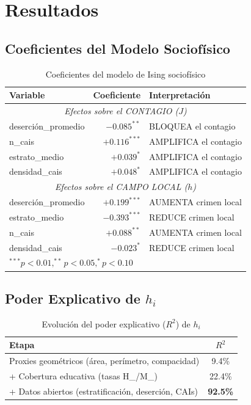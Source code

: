 \documentclass[12pt,a4paper]{article}
\begin{document}
\section{Resultados}

\subsection{Coeficientes del Modelo Sociofísico}

\begin{table}[H]
\centering
\caption{Coeficientes del modelo de Ising sociofísico}
\label{tab:coeficientes}
\begin{tabular}{@{}lrl@{}}
\toprule
\textbf{Variable} & \textbf{Coeficiente} & \textbf{Interpretación} \\
\midrule
\multicolumn{3}{c}{\textit{Efectos sobre el CONTAGIO ($J$)}} \\
\midrule
deserción\_promedio & $-0.085^{**}$ & BLOQUEA el contagio \\
n\_cais & $+0.116^{***}$ & AMPLIFICA el contagio \\
estrato\_medio & $+0.039^{*}$ & AMPLIFICA el contagio \\
densidad\_cais & $+0.048^{*}$ & AMPLIFICA el contagio \\
\midrule
\multicolumn{3}{c}{\textit{Efectos sobre el CAMPO LOCAL ($h$)}} \\
\midrule
deserción\_promedio & $+0.199^{***}$ & AUMENTA crimen local \\
estrato\_medio & $-0.393^{***}$ & REDUCE crimen local \\
n\_cais & $+0.088^{**}$ & AUMENTA crimen local \\
densidad\_cais & $-0.023^{*}$ & REDUCE crimen local \\
\bottomrule
\multicolumn{3}{l}{\footnotesize $^{***}p<0.01, ^{**}p<0.05, ^{*}p<0.10$} \\
\end{tabular}
\end{table}

\subsection{Poder Explicativo de $h_i$}

\begin{table}[H]
\centering
\caption{Evolución del poder explicativo ($R^2$) de $h_i$}
\label{tab:r2}
\begin{tabular}{@{}lc@{}}
\toprule
\textbf{Etapa} & \textbf{$R^2$} \\
\midrule
Proxies geométricos (área, perímetro, compacidad) & 9.4\% \\
+ Cobertura educativa (tasas H\_/M\_) & 22.4\% \\
+ Datos abiertos (estratificación, deserción, CAIs) & \textbf{92.5\%} \\
\bottomrule
\end{tabular}
\end{table}
\end{document}
